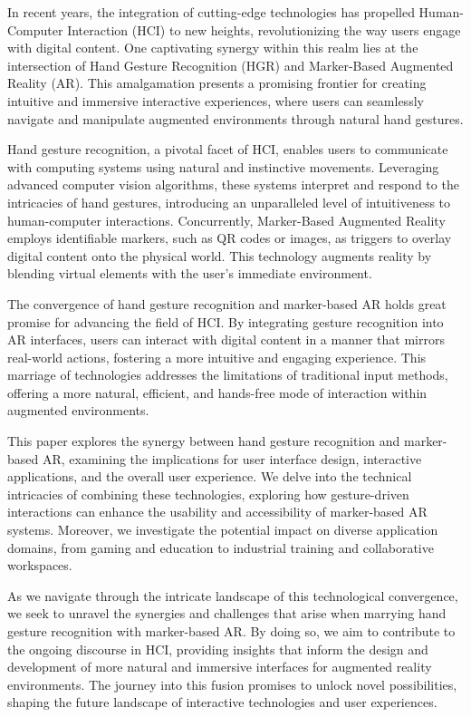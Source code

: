 \documentclass[journal]{IEEEtran}
\begin{document}
In recent years, the integration of cutting-edge technologies has propelled Human-Computer Interaction (HCI) to new heights, 
revolutionizing the way users engage with digital content. One captivating synergy within this realm lies at the intersection 
of Hand Gesture Recognition (HGR) and Marker-Based Augmented Reality (AR). This amalgamation presents a promising frontier for 
creating intuitive and immersive interactive experiences, where users can seamlessly navigate and manipulate augmented environments 
through natural hand gestures.

Hand gesture recognition, a pivotal facet of HCI, enables users to communicate with computing systems using natural and instinctive 
movements. Leveraging advanced computer vision algorithms, these systems interpret and respond to the intricacies of hand gestures, 
introducing an unparalleled level of intuitiveness to human-computer interactions. Concurrently, Marker-Based Augmented Reality 
employs identifiable markers, such as QR codes or images, as triggers to overlay digital content onto the physical world. 
This technology augments reality by blending virtual elements with the user's immediate environment.

The convergence of hand gesture recognition and marker-based AR holds great promise for advancing the field of HCI. By integrating 
gesture recognition into AR interfaces, users can interact with digital content in a manner that mirrors real-world actions, 
fostering a more intuitive and engaging experience. This marriage of technologies addresses the limitations of traditional input methods, 
offering a more natural, efficient, and hands-free mode of interaction within augmented environments.

This paper explores the synergy between hand gesture recognition and marker-based AR, examining the implications for user interface 
design, interactive applications, and the overall user experience. We delve into the technical intricacies of combining these 
technologies, exploring how gesture-driven interactions can enhance the usability and accessibility of marker-based AR systems. 
Moreover, we investigate the potential impact on diverse application domains, from gaming and education to industrial training and 
collaborative workspaces.

As we navigate through the intricate landscape of this technological convergence, we seek to unravel the synergies and challenges 
that arise when marrying hand gesture recognition with marker-based AR. By doing so, we aim to contribute to the ongoing discourse 
in HCI, providing insights that inform the design and development of more natural and immersive interfaces for augmented reality environments. 
The journey into this fusion promises to unlock novel possibilities, shaping the future landscape of interactive technologies and user experiences.
\end{document}
